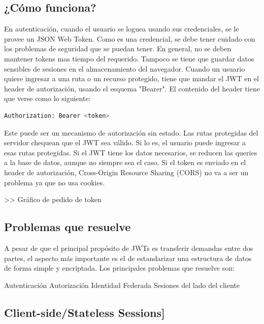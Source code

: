 \subsection[¿Cómo funciona?]{¿Cómo funciona?}

En autenticación, cuando el usuario se loguea usando sus credenciales, se le provee un JSON Web Token. Como es una credencial, se debe tener cuidado con los problemas de seguridad que se puedan tener. En general, no se deben mantener tokens mas tiempo del requerido. Tampoco se tiene que guardar datos sensibles de sesiones en el almacenamiento del navegador.
Cuando un usuario quiere ingresar a una ruta o un recurso protegido, tiene que mandar el JWT en el header de autorización, usando el esquema "Bearer". El contenido del header tiene que verse como lo siguiente:
\begin{lstlisting}[language=Python]
Authorization: Bearer <token>
\end{lstlisting}

Este puede ser un mecanismo de autorización sin estado. Las rutas protegidas del servidor chequean que el JWT sea válido. Si lo es, el usuario puede ingresar a esas rutas protegidas. Si el JWT tiene los datos necesarios, se reducen las queries a la base de datos, aunque no siempre sea el caso.
Si el token es enviado en el header de autorización, Cross-Origin Resource Sharing (CORS) no va a ser un problema ya que no usa cookies.

>> Gráfico de pedido de token



\subsection[Problemas que resuelve]{Problemas que resuelve}

A pesar de que el principal propósito de JWTs es transferir demandas entre dos partes, el aspecto más importante es el de estandarizar una estructura de datos de forma simple y encriptada. 
Los principales problemas que resuelve son:
\begin{outline}
\2 Autenticación
\2 Autorización
\2 Identidad Federada
\2 Sesiones del lado del cliente
\end{outline}

\subsection[Client-side/Stateless Sessions]{Client-side/Stateless Sessions]}

